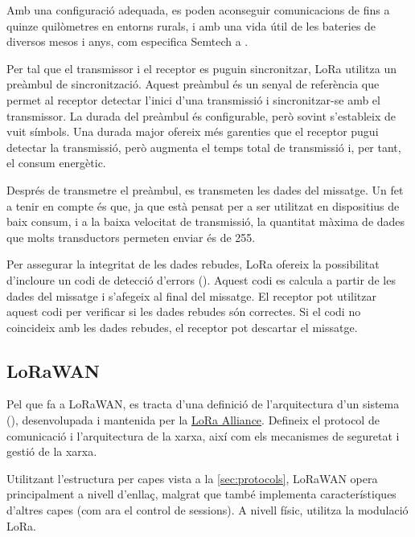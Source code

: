\documentclass{tfgitic}[2024/07/01]
\begin{document}
Amb una configuració adequada, es poden aconseguir comunicacions de fins a quinze quilòmetres en entorns rurals, i amb una vida útil de les bateries de diversos mesos i anys, com especifica Semtech a \cite{noauthor_lora_2024}.

Per tal que el transmissor i el receptor es puguin sincronitzar, LoRa utilitza un preàmbul de sincronització. Aquest preàmbul és un senyal de referència que permet al receptor detectar l'inici d'una transmissió i sincronitzar-se amb el transmissor. La durada del preàmbul és configurable, però sovint s'estableix de vuit símbols. Una durada major ofereix més garenties que el receptor pugui detectar la transmissió, però augmenta el temps total de transmissió i, per tant, el consum energètic.

Després de transmetre el preàmbul, es transmeten les dades del missatge. Un fet a tenir en compte és que, ja que està pensat per a ser utilitzat en dispositius de baix consum, i a la baixa velocitat de transmissió, la quantitat màxima de dades que molts transductors permeten enviar és de \SI{255}{\byte}.

Per assegurar la integritat de les dades rebudes, LoRa ofereix la possibilitat d'incloure un codi de detecció d'errors (). Aquest codi es calcula a partir de les dades del missatge i s'afegeix al final del missatge. El receptor pot utilitzar aquest codi per verificar si les dades rebudes són correctes. Si el codi no coincideix amb les dades rebudes, el receptor pot descartar el missatge.


\subsection{LoRaWAN}
Pel que fa a LoRaWAN, es tracta d'una definició de l'arquitectura d'un sistema  (), desenvolupada i mantenida per la \href{https://lora-alliance.org}{LoRa Alliance}. Defineix el protocol de comunicació i l'arquitectura de la xarxa, així com els mecanismes de seguretat i gestió de la xarxa. 

Utilitzant l'estructura per capes vista a la \autoref{sec:protocols}, LoRaWAN opera principalment a nivell d'enllaç, malgrat que també implementa característiques d'altres capes (com ara el control de sessions). A nivell físic, utilitza la modulació LoRa.
\end{document}
